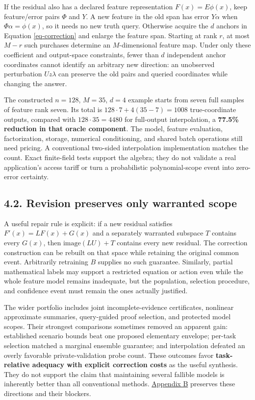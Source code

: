 \documentclass{article}
\theoremstyle{definition}
\begin{document}
If the residual also has a declared feature representation
\(F(x)=E\phi(x)\), keep feature/error pairs \(\Phi\) and \(Y\). A new
feature in the old span has error \(Y\alpha\) when
\(\Phi\alpha=\phi(x)\), so it needs no new truth query. Otherwise
acquire the \(d\) anchors in Equation \ref{eq-correction} and enlarge
the feature span. Starting at rank \(r\), at most \(M-r\) such purchases
determine an \(M\)-dimensional feature map. Under only these coefficient
and output-space constraints, fewer than \(d\) independent anchor
coordinates cannot identify an arbitrary new direction: an unobserved
perturbation \(Uz\lambda\) can preserve the old pairs and queried
coordinates while changing the answer.

The constructed \(n=128\), \(M=35\), \(d=4\) example starts from seven
full samples of feature rank seven. Its total is
\(128\cdot7+4(35-7)=1008\) true-coordinate outputs, compared with
\(128\cdot35=4480\) for full-output interpolation, a \textbf{77.5\%
reduction in that oracle component}. The model, feature evaluation,
factorization, storage, numerical conditioning, and shared batch
operations still need pricing. A conventional two-sided interpolation
implementation matches the count. Exact finite-field tests support the
algebra; they do not validate a real application's access tariff or turn
a probabilistic polynomial-scope event into zero-error certainty.

\subsection{4.2. Revision preserves only warranted
scope}\label{sec-model-revision}

A useful repair rule is explicit: if a new residual satisfies
\(F'(x)=LF(x)+G(x)\) and a separately warranted subspace \(T\) contains
every \(G(x)\), then \(\mathrm{image}(LU)+T\) contains every new
residual. The correction construction can be rebuilt on that space while
retaining the original common event. Arbitrarily retraining \(B\)
supplies no such guarantee. Similarly, partial mathematical labels may
support a restricted equation or action even while the whole feature
model remains inadequate, but the population, selection procedure, and
confidence event must remain the ones actually justified.

The wider portfolio includes joint incomplete-evidence certificates,
nonlinear approximate summaries, query-guided proof selection, and
protected model scopes. Their strongest comparisons sometimes removed an
apparent gain: established scenario bounds beat one proposed elementary
envelope; per-task selection matched a marginal ensemble guarantee; and
interpolation defeated an overly favorable private-validation probe
count. These outcomes favor \textbf{task-relative adequacy with explicit
correction costs} as the useful synthesis. They do not support the claim
that maintaining several fallible models is inherently better than all
conventional methods.
\href{https://github.com/TristanMiano/value_logic/blob/main/v3/report/portfolio.md}{Appendix
B} preserves these directions and their blockers.
\end{document}
